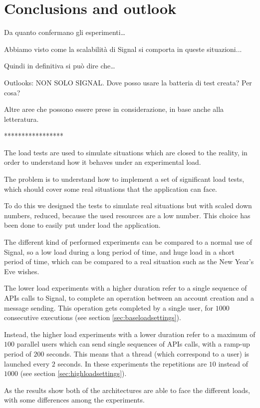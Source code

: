 \chapter{Conclusions and outlook\label{sec:conclusionsoutlook}}

Da quanto confermano gli esperimenti\dots

Abbiamo visto come la scalabilità di Signal si comporta in queste situazioni...

Quindi in definitiva si può dire che\dots

Outlooks: NON SOLO SIGNAL. Dove posso usare la batteria di test creata? Per cosa?

Altre aree che possono essere prese in considerazione, in base anche alla letteratura.

*****************

The load tests are used to simulate situations which are closed to the reality, in order to understand how it behaves under an experimental load.

The problem is to understand how to implement a set of significant load tests, which should cover some real situations that the application can face.

To do this we designed the tests to simulate real situations but with scaled down numbers, reduced, because the used resources are a low number. This choice has been done to easily put under load the application.

The different kind of performed experiments can be compared to a normal use of Signal, so a low load during a long period of time, and huge load in a short period of time, which can be compared to a real situation such as the New Year's Eve wishes.

The lower load experiments with a higher duration refer to a single sequence of APIs calls to Signal, to complete an operation between an account creation and a message sending.
This operation gets completed by a single user, for $1000$ consecutive executions (see section \vref{sec:baseloadsettings}).

Instead, the higher load  experiments with a lower duration refer to a maximum of $100$ parallel users which can send single sequences of APIs calls, with a ramp-up period of $200$ seconds. This means that a thread (which correspond to a user) is launched every $2$ seconds. In these experiments the repetitions are $10$ instead of $1000$ (see section \vref{sec:highloadsettings}).

As the results show both of the architectures are able to face the different loads, with some differences among the experiments.

